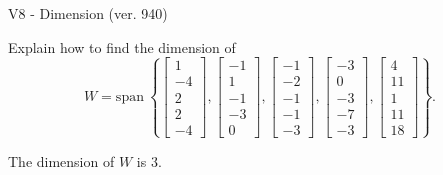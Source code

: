 \begin{exercise}
  \begin{exerciseTitle}V8 - Dimension (ver. 940)\end{exerciseTitle}
  \begin{exerciseStatement}
    Explain how to find the dimension of 
\[W=\mathrm{span}\ \left\{\left[\begin{array}{r}
1 \\
-4 \\
2 \\
2 \\
-4
\end{array}\right] , \left[\begin{array}{r}
-1 \\
1 \\
-1 \\
-3 \\
0
\end{array}\right] , \left[\begin{array}{r}
-1 \\
-2 \\
-1 \\
-1 \\
-3
\end{array}\right] , \left[\begin{array}{r}
-3 \\
0 \\
-3 \\
-7 \\
-3
\end{array}\right] , \left[\begin{array}{r}
4 \\
11 \\
1 \\
11 \\
18
\end{array}\right]\right\}.\]



  \end{exerciseStatement}
  \begin{exerciseAnswer}
   The dimension of \(W\) is  \(3\).
  


  \end{exerciseAnswer}
\end{exercise}